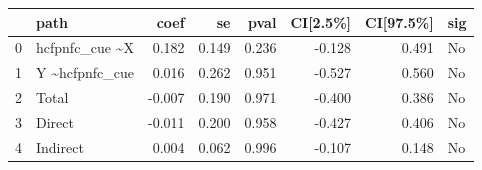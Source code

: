 \begin{tabular}{llrrrrrl}
\toprule
{} &             path &   coef &     se &   pval &  CI[2.5\%] &  CI[97.5\%] & sig \\
\midrule
0 &  hcfpnfc\_cue \textasciitilde  X &  0.182 &  0.149 &  0.236 &    -0.128 &      0.491 &  No \\
1 &  Y \textasciitilde  hcfpnfc\_cue &  0.016 &  0.262 &  0.951 &    -0.527 &      0.560 &  No \\
2 &            Total & -0.007 &  0.190 &  0.971 &    -0.400 &      0.386 &  No \\
3 &           Direct & -0.011 &  0.200 &  0.958 &    -0.427 &      0.406 &  No \\
4 &         Indirect &  0.004 &  0.062 &  0.996 &    -0.107 &      0.148 &  No \\
\bottomrule
\end{tabular}
